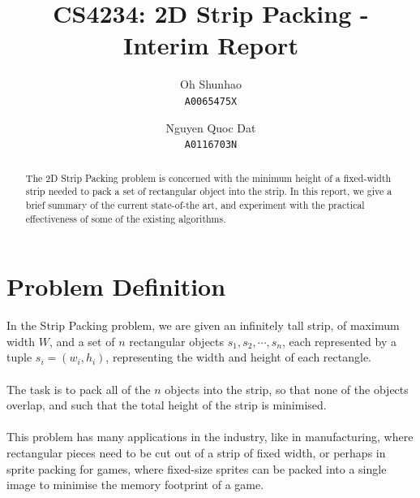 \documentclass{article}
\begin{document}
\theoremstyle{plain}
\newtheorem{thm}{Theorem}
\newtheorem{lem}[thm]{Lemma}
\newtheorem{prop}[thm]{Proposition}
\newtheorem{corr}{Corollary}
\theoremstyle{definition}
\newtheorem{defn}{Definition}
\newtheorem{conj}{Conjecture}
\newtheorem{exmp}{Example}
\theoremstyle{remark}
\newtheorem*{rem}{Remark}
\newtheorem*{note}{Note}
\newtheorem{case}{Case}

\author{
Oh Shunhao\\
  \texttt{A0065475X}
  \and
Nguyen Quoc Dat\\
  \texttt{A0116703N}
}
\title{CS4234: 2D Strip Packing - Interim Report}
\date{}

\maketitle

\begin{abstract}
\begin{center}
The 2D Strip Packing problem is concerned with the minimum height of a fixed-width strip needed to pack a set of rectangular object into the strip. In this report, we give a brief summary of the current state-of-the art, and experiment with the practical effectiveness of some of the existing algorithms.
\end{center}
\end{abstract}

\section{Problem Definition}
In the Strip Packing problem, we are given an infinitely tall strip, of maximum width $W$, and a set of $n$ rectangular objects $s_1,s_2,\cdots,s_n$, each represented by a tuple $s_i = (w_i,h_i)$, representing the width and height of each rectangle.\\
\\
The task is to pack all of the $n$ objects into the strip, so that none of the objects overlap, and such that the total height of the strip is minimised.\\
\\
This problem has many applications in the industry, like in manufacturing, where rectangular pieces need to be cut out of a strip of fixed width, or perhaps in sprite packing for games, where fixed-size sprites can be packed into a single image to minimise the memory footprint of a game.\\
\end{document}
